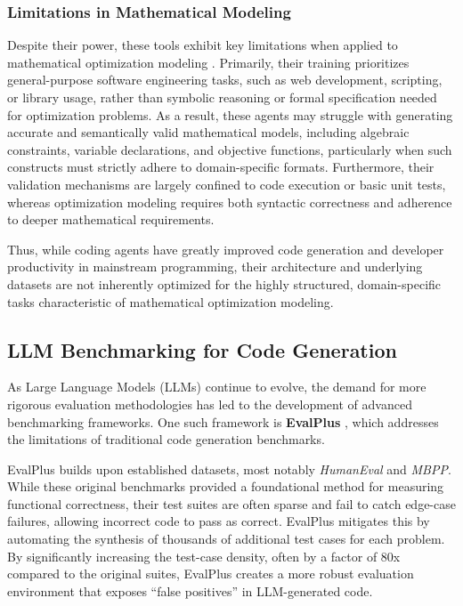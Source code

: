 \subsubsection{Limitations in Mathematical Modeling}
Despite their power, these tools exhibit key limitations when applied to mathematical optimization modeling \cite{forootani2025surveymathematicalreasoningoptimization}. Primarily, their training prioritizes general-purpose software engineering tasks, such as web development, scripting, or library usage, rather than symbolic reasoning or formal specification needed for optimization problems. As a result, these agents may struggle with generating accurate and semantically valid mathematical models, including algebraic constraints, variable declarations, and objective functions, particularly when such constructs must strictly adhere to domain-specific formats. Furthermore, their validation mechanisms are largely confined to code execution or basic unit tests, whereas optimization modeling requires both syntactic correctness and adherence to deeper mathematical requirements.

Thus, while coding agents have greatly improved code generation and developer productivity in mainstream programming, their architecture and underlying datasets are not inherently optimized for the highly structured, domain-specific tasks characteristic of mathematical optimization modeling.


\subsection{LLM Benchmarking for Code Generation}
As Large Language Models (LLMs) continue to evolve, the demand for more rigorous evaluation methodologies has led to the development of advanced benchmarking frameworks. One such framework is \textbf{EvalPlus} \cite{liu2023codegeneratedchatgptreally}, which addresses the limitations of traditional code generation benchmarks. 

EvalPlus builds upon established datasets, most notably \emph{HumanEval} \cite{chen2021evaluatinglargelanguagemodels} and \emph{MBPP}. While these original benchmarks provided a foundational method for measuring functional correctness, their test suites are often sparse and fail to catch edge-case failures, allowing incorrect code to pass as correct. EvalPlus mitigates this by automating the synthesis of thousands of additional test cases for each problem. By significantly increasing the test-case density, often by a factor of 80x compared to the original suites, EvalPlus creates a more robust evaluation environment that exposes ``false positives'' in LLM-generated code. 


